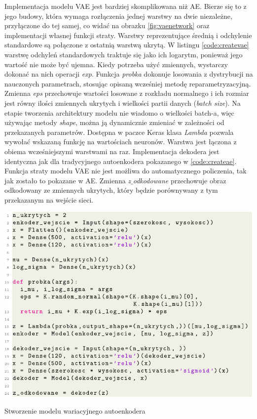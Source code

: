 \documentclass[a4paper,12pt,oneside]{book} %
\begin{document}
Implementacja modelu VAE jest bardziej skomplikowana niż AE. Bierze się to z jego budowy, która wymaga rozłączenia jednej warstwy na dwie niezależne, przyłączone do tej samej, co widać na obrazku \ref{fig:vaenetwork} oraz implementacji własnej funkcji straty. Warstwy reprezentujące średnią i odchylenie standardowe są połączone z ostatnią warstwą ukrytą. W listingu \ref{code:createvae} warstwę odchyleń standardowych traktuje się jako ich logarytm, ponieważ jego wartość nie może być ujemna. Kiedy potrzeba użyć zmiennych, wystarczy dokonać na nich operacji \textit{exp}. Funkcja \textit{probka} dokonuje losowania z dystrybucji na nauczonych parametrach, stosując opisaną wcześniej metodę reparametryzacyjną. Zmienna \textit{eps} przechowuje wartości losowane z rozkładu normalnego i ich rozmiar jest równy ilości zmiennych ukrytych i wielkości partii danych (\textit{batch size}). Na etapie tworzenia architektury modelu nie wiadomo o wielkości batch-a, więc używając metody \textit{shape}, można ją dynamicznie zmieniać w zależności od przekazanych parametrów. Dostępna w paczce Keras klasa \textit{Lambda} pozwala wywołać wskazaną funkcję na wartościach neuronów. Warstwa jest łączona z obiema wcześniejszymi warstwami na raz. Implementacja dekodera jest identyczna jak dla tradycyjnego autoenkodera pokazanego w \ref{code:createae}. Funkcja straty modelu VAE nie jest możliwa do automatycznego policzenia, tak jak zostało to pokazane w AE. Zmienna \textit{z$\_$odkodowane} przechowuje obraz odkodowany ze zmiennych ukrytych, który będzie porównywany z tym przekazanym na wejście sieci.

\begin{code}[h!]
	\centering
	\includegraphics[width=\linewidth]{modelvae.pdf}
	\caption{Stworzenie modelu wariacyjnego autoenkodera}
	\label{code:createvae}
\end{code}
\end{document}
